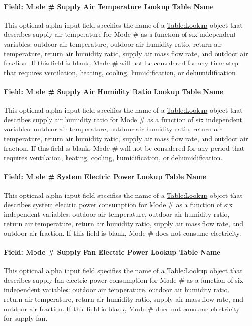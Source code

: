\paragraph{Field: Mode \# Supply Air Temperature Lookup Table Name}
This optional alpha input field specifies the name of a \hyperref[tablelookup]{Table:Lookup} object that describes supply air temperature for Mode \# as a function of six independent variables: outdoor air temperature, outdoor air humidity ratio, return air temperature, return air humidity ratio, supply air mass flow rate, and outdoor air fraction. If this field is blank, Mode \# will not be considered for any time step that requires ventilation, heating, cooling, humidification, or dehumidification.

\paragraph{Field: Mode \# Supply Air Humidity Ratio Lookup Table Name}
This optional alpha input field specifies the name of a \hyperref[tablelookup]{Table:Lookup} object that describes supply air humidity ratio for Mode \# as a function of six independent variables: outdoor air temperature, outdoor air humidity ratio, return air temperature, return air humidity ratio, supply air mass flow rate, and outdoor air fraction. If this field is blank, Mode \# will not be considered for any period that requires ventilation, heating, cooling, humidification, or dehumidification.

\paragraph{Field: Mode \# System Electric Power Lookup Table Name}
This optional alpha input field specifies the name of a \hyperref[tablelookup]{Table:Lookup} object that describes system electric power consumption for Mode \# as a function of six independent variables: outdoor air temperature, outdoor air humidity ratio, return air temperature, return air humidity ratio, supply air mass flow rate, and outdoor air fraction. If this field is blank, Mode \# does not consume electricity.

\paragraph{Field: Mode \# Supply Fan Electric Power Lookup Table Name}
This optional alpha input field specifies the name of a \hyperref[tablelookup]{Table:Lookup} object that describes supply fan electric power consumption for Mode \# as a function of six independent variables: outdoor air temperature, outdoor air humidity ratio, return air temperature, return air humidity ratio, supply air mass flow rate, and outdoor air fraction. If this field is blank, Mode \# does not consume electricity for supply fan.

